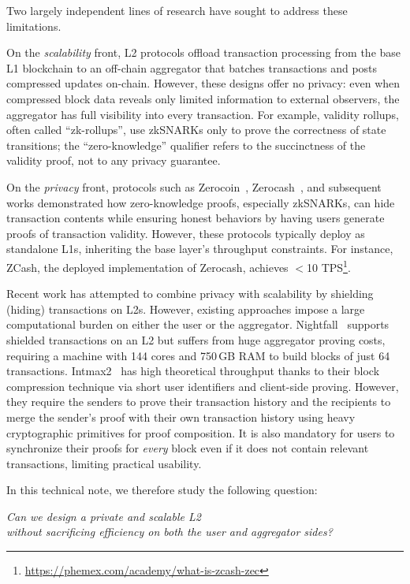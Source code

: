 \documentclass[a4paper,10pt]{article}
\begin{document}
Two largely independent lines of research have sought to address these limitations.

On the \textit{scalability} front, \ac{L2} protocols offload transaction processing from the base \ac{L1} blockchain to an off-chain aggregator that batches transactions and posts compressed updates on-chain.
However, these designs offer no privacy: even when compressed block data reveals only limited information to external observers, the aggregator has full visibility into every transaction.
For example, validity rollups, often called ``zk-rollups'', use \acp{zkSNARK} only to prove the correctness of state transitions; the ``zero-knowledge'' qualifier refers to the succinctness of the validity proof, not to any privacy guarantee.

On the \textit{privacy} front, protocols such as Zerocoin~\cite{SP:MGGR13}, Zerocash~\cite{SP:BCGGMT14}, and subsequent works demonstrated how zero-knowledge proofs, especially \acp{zkSNARK}, can hide transaction contents while ensuring honest behaviors by having users generate proofs of transaction validity.
However, these protocols typically deploy as standalone \acp{L1}, inheriting the base layer's throughput constraints.
For instance, ZCash, the deployed implementation of Zerocash, achieves $<$10 \ac{TPS}\footnote{\url{https://phemex.com/academy/what-is-zcash-zec}}.

Recent work has attempted to combine privacy with scalability by shielding (hiding) transactions on \acp{L2}.
However, existing approaches impose a large computational burden on either the user or the aggregator.
Nightfall~\cite{nightfall4} supports shielded transactions on an \ac{L2} but suffers from huge aggregator proving costs, requiring a machine with 144 cores and 750\,GB RAM to build blocks of just 64 transactions.
Intmax2~\cite{cryptoeprint:2023/1082} has high theoretical throughput thanks to their block compression technique via short user identifiers and client-side proving.
However, they require the senders to prove their transaction history and the recipients to merge the sender's proof with their own transaction history using heavy cryptographic primitives for proof composition.
It is also mandatory for users to synchronize their proofs for \textit{every} block even if it does not contain relevant transactions, limiting practical usability.

In this technical note, we therefore study the following question:

\begin{center}
    \textit{Can we design a private and scalable \ac{L2} \\ without sacrificing efficiency on both the user and aggregator sides?}
\end{center}
\end{document}
